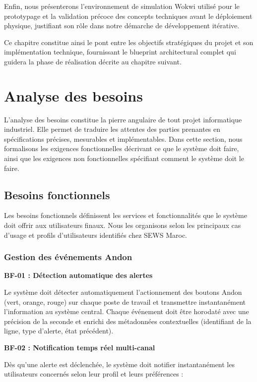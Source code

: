 Enfin, nous présenterons l'environnement de simulation Wokwi utilisé pour le prototypage et la validation précoce des concepts techniques avant le déploiement physique, justifiant son rôle dans notre démarche de développement itérative.

Ce chapitre constitue ainsi le pont entre les objectifs stratégiques du projet et son implémentation technique, fournissant le blueprint architectural complet qui guidera la phase de réalisation décrite au chapitre suivant.


\section{Analyse des besoins}

L'analyse des besoins constitue la pierre angulaire de tout projet informatique industriel. Elle permet de traduire les attentes des parties prenantes en spécifications précises, mesurables et implémentables. Dans cette section, nous formalisons les exigences fonctionnelles décrivant ce que le système doit faire, ainsi que les exigences non fonctionnelles spécifiant comment le système doit le faire.

\subsection{Besoins fonctionnels}

Les besoins fonctionnels définissent les services et fonctionnalités que le système doit offrir aux utilisateurs finaux. Nous les organisons selon les principaux cas d'usage et profils d'utilisateurs identifiés chez SEWS Maroc.

\subsubsection{Gestion des événements Andon}

\textbf{BF-01 : Détection automatique des alertes}

Le système doit détecter automatiquement l'actionnement des boutons Andon (vert, orange, rouge) sur chaque poste de travail et transmettre instantanément l'information au système central. Chaque événement doit être horodaté avec une précision de la seconde et enrichi des métadonnées contextuelles (identifiant de la ligne, type d'alerte, état précédent).

\textbf{BF-02 : Notification temps réel multi-canal}

Dès qu'une alerte est déclenchée, le système doit notifier instantanément les utilisateurs concernés selon leur profil et leurs préférences :

